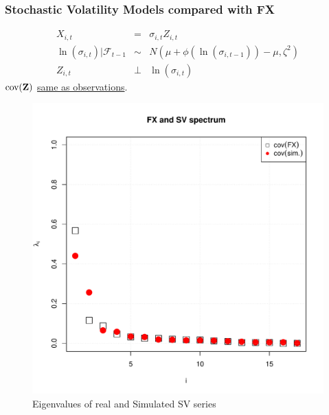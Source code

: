 \documentclass{beamer}
\begin{document}
\begin{frame}
  \frametitle{Stochastic Volatility Models compared with FX}
  \begin{minipage}{0.6\linewidth}
    \begin{scriptsize}
      \begin{eqnarray*}
        X_{i, t} &=& \sigma_{i, t} Z_{i,t} \\
        \ln(\sigma_{i,t})|\mathcal F_{t-1} &\sim& N(\mu + \phi(\ln(\sigma_{i,t-1})) - \mu, \zeta^2)\\
        Z_{i, t} &\bot& \ln(\sigma_{i,t})
      \end{eqnarray*}
      $\text{cov}(\mathbf{Z})$ \underline{same as observations}.
    \end{scriptsize}
  \end{minipage}\hfill
  \begin{minipage}{0.4\linewidth}
    \begin{figure}[htb!]
      \centering
      \includegraphics[width=1.0\linewidth]{FX_sv_eigenvalues.pdf}
      \caption{\scriptsize Eigenvalues of real and Simulated SV series}
    \end{figure}
  \end{minipage}
\end{frame}
\end{document}
